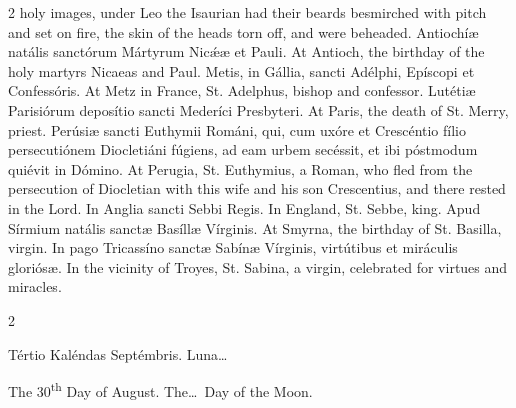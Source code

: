 \begin{paracol}{2}
 holy images, under Leo the Isaurian had their beards besmirched with pitch 
 and set on fire, the skin of the heads torn off, and were beheaded.
\switchcolumn*
{}
Antiochíæ natális 
 sanctórum Mártyrum Nicǽæ et Pauli.
\switchcolumn
{}
At Antioch, the birthday of the holy 
 martyrs Nicaeas and Paul.
\switchcolumn*
{}
Metis, in Gállia, 
 sancti Adélphi, Epíscopi et Confessóris.
\switchcolumn
{}
At Metz in France, St. Adelphus, 
 bishop and confessor.
\switchcolumn*
{}
Lutétiæ Parisiórum 
 deposítio sancti Mederíci Presbyteri.
\switchcolumn
{}
At Paris, the death of St. Merry, 
 priest.
\switchcolumn*
{}
Perúsiæ sancti Euthymii 
 Románi, qui, cum uxóre et Crescéntio fílio persecutiónem Diocletiáni fúgiens, 
 ad eam urbem secéssit, et ibi póstmodum quiévit in Dómino.
\switchcolumn
{}
At Perugia, St. Euthymius, a Roman, 
 who fled from the persecution of Diocletian with this wife and his son 
 Crescentius, and there rested in the Lord.
\switchcolumn*
{}
In Anglia sancti Sebbi 
 Regis.
\switchcolumn
{}
In England, St. Sebbe, king.
\switchcolumn*
{}
Apud Sírmium natális 
 sanctæ Basíllæ Vírginis.
\switchcolumn
{}
At Smyrna, the birthday of St. 
 Basilla, virgin.
\switchcolumn*
{}
In pago Tricassíno 
 sanctæ Sabínæ Vírginis, virtútibus et miráculis gloriósæ.
\switchcolumn
{}
In the vicinity of Troyes, St. 
 Sabina, a virgin, celebrated for virtues and miracles.
\switchcolumn*
{}
\end{paracol}


\begin{paracol}{2}
\begin{center}{\color{gregoriocolor} Tértio Kaléndas Septémbris. 
 Luna\dots\ }\end{center}
\switchcolumn
{}
\begin{center}{\color{gregoriocolor} The 
 30\textsuperscript{th} Day of 
 August. The\dots\ Day of the Moon.}\end{center}
\end{paracol}

